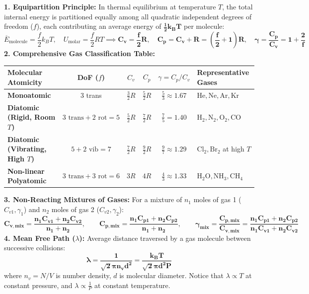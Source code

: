 \documentclass[10pt,a4paper]{article}
\begin{document}
\begin{formulabox}
\textbf{1. Equipartition Principle:}
In thermal equilibrium at temperature $T$, the total internal energy is partitioned equally among all quadratic independent degrees of freedom ($f$), each contributing an average energy of $\mathbf{\frac{1}{2}k_B T}$ per molecule:
\begin{equation}
  \overline{E}_{\text{molecule}} = \frac{f}{2}k_B T, \quad U_{\text{molar}} = \frac{f}{2} R T \implies \mathbf{C_v = \frac{f}{2}R}, \quad \mathbf{C_p = C_v + R = \left(\frac{f}{2} + 1\right)R}, \quad \mathbf{\gamma = \frac{C_p}{C_v} = 1 + \frac{2}{f}}
\end{equation}
\textbf{2. Comprehensive Gas Classification Table:}
\begin{center}
\begin{tabularx}{\linewidth}{|l|c|c|c|c|Y|}
\hline
\textbf{Molecular Atomicity} & \textbf{DoF ($f$)} & $C_v$ & $C_p$ & $\gamma = C_p / C_v$ & \textbf{Representative Gases} \\
\hline
\textbf{Monoatomic} & $3$ trans & $\frac{3}{2}R$ & $\frac{5}{2}R$ & $\frac{5}{3} \approx 1.67$ & $\mathrm{He, Ne, Ar, Kr}$ \\
\hline
\textbf{Diatomic (Rigid, Room $T$)} & $3\text{ trans} + 2\text{ rot} = 5$ & $\frac{5}{2}R$ & $\frac{7}{2}R$ & $\frac{7}{5} = 1.40$ & $\mathrm{H_2, N_2, O_2, CO}$ \\
\hline
\textbf{Diatomic (Vibrating, High $T$)} & $5 + 2\text{ vib} = 7$ & $\frac{7}{2}R$ & $\frac{9}{2}R$ & $\frac{9}{7} \approx 1.29$ & $\mathrm{Cl_2, Br_2}$ at high $T$ \\
\hline
\textbf{Non-linear Polyatomic} & $3\text{ trans} + 3\text{ rot} = 6$ & $3R$ & $4R$ & $\frac{4}{3} \approx 1.33$ & $\mathrm{H_2O, NH_3, CH_4}$ \\
\hline
\end{tabularx}
\end{center}
\textbf{3. Non-Reacting Mixtures of Gases:}
For a mixture of $n_1$ moles of gas 1 ($C_{v1}, \gamma_1$) and $n_2$ moles of gas 2 ($C_{v2}, \gamma_2$):
\begin{equation}
  \mathbf{C_{v,\text{mix}} = \frac{n_1 C_{v1} + n_2 C_{v2}}{n_1 + n_2}}, \qquad \mathbf{C_{p,\text{mix}} = \frac{n_1 C_{p1} + n_2 C_{p2}}{n_1 + n_2}}, \qquad \mathbf{\gamma_{\text{mix}} = \frac{C_{p,\text{mix}}}{C_{v,\text{mix}}} = \frac{n_1 C_{p1} + n_2 C_{p2}}{n_1 C_{v1} + n_2 C_{v2}}}
\end{equation}
\textbf{4. Mean Free Path ($\lambda$):}
Average distance traversed by a gas molecule between successive collisions:
\begin{equation}
  \mathbf{\lambda = \frac{1}{\sqrt{2} \pi n_v d^2} = \frac{k_B T}{\sqrt{2} \pi d^2 P}}
\end{equation}
where $n_v = N/V$ is number density, $d$ is molecular diameter. Notice that $\lambda \propto T$ at constant pressure, and $\lambda \propto \frac{1}{P}$ at constant temperature.
\end{formulabox}
\end{document}
